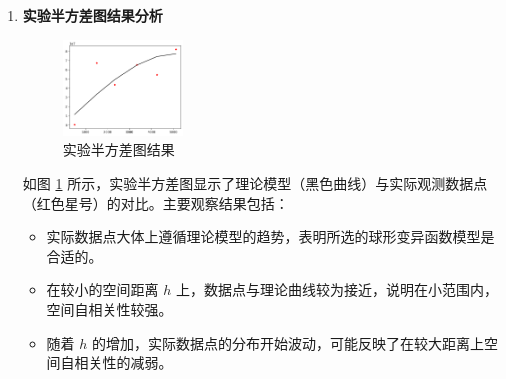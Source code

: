 \documentclass[12pt,a4paper]{nmmcm}
\begin{document}
\begin{enumerate}
  \item \textbf{实验半方差图结果分析} \\
        \begin{figure}[H]
          \centering
          \includegraphics[width=0.3\textwidth]{figures/task4/task4-1.png}
          \caption{实验半方差图结果}
          \label{fig:KrigingSemivariogram}
        \end{figure}
        如图 \ref{fig:KrigingSemivariogram} 所示，实验半方差图显示了理论模型（黑色曲线）与实际观测数据点（红色星号）的对比。主要观察结果包括：
        \begin{itemize}
          \item 实际数据点大体上遵循理论模型的趋势，表明所选的球形变异函数模型是合适的。
          \item 在较小的空间距离 \( h \) 上，数据点与理论曲线较为接近，说明在小范围内，空间自相关性较强。
          \item 随着 \( h \) 的增加，实际数据点的分布开始波动，可能反映了在较大距离上空间自相关性的减弱。
        \end{itemize}


\end{enumerate}
\end{document}
